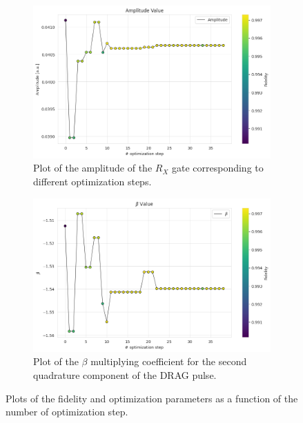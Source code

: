 \begin{figure}[htbp]
    \begin{subfigure}[t]{0.45\textwidth}
        \includegraphics[width=\textwidth]{figures/png/RB_optimization/NM/post_ft_true/amplitude.png}
        \caption{Plot of the amplitude of the $R_X$ gate corresponding to different optimization steps.}
        \label{NM_true_fig:amplitude}
    \end{subfigure}
    \hfill
    \begin{subfigure}[t]{0.45\textwidth}
        \includegraphics[width=\textwidth]{figures/png/RB_optimization/NM/post_ft_true/beta.png}
        \caption{Plot of the $\beta$ multiplying coefficient for the second quadrature component of the DRAG pulse.}
        \label{NM_true_fig:beta}
    \end{subfigure}

    \caption{Plots of the fidelity and optimization parameters as a function of the number of optimization step.}
    \label{fig:NM_plots}
\end{figure}


